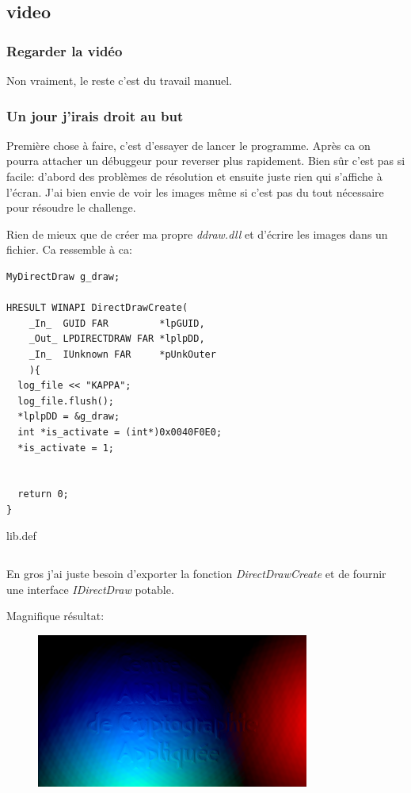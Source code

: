 \documentclass[14pt]{article}
\let\oldinputminted\inputminted
\renewcommand{\inputminted}[2]{\begin{tcolorbox}\oldinputminted[breaklines]{#1}{#2}\end{tcolorbox}}
\begin{document}
\subsection{video}
\subsubsection{Regarder la vidéo}
Non vraiment, le reste c'est du travail manuel.

\subsubsection{Un jour j'irais droit au but}

Première chose à faire, c'est d'essayer de lancer le programme. Après ca on pourra attacher un débuggeur pour reverser plus rapidement. Bien sûr c'est pas si facile: d'abord des problèmes de résolution et ensuite juste rien qui s'affiche à l'écran.
J'ai bien envie de voir les images même si c'est pas du tout nécessaire pour résoudre le challenge.

Rien de mieux que de créer ma propre {\em ddraw.dll} et d'écrire les images dans un fichier. Ca ressemble à ca:

\begin{verbatim}
MyDirectDraw g_draw;

HRESULT WINAPI DirectDrawCreate(
    _In_  GUID FAR         *lpGUID,
    _Out_ LPDIRECTDRAW FAR *lplpDD,
    _In_  IUnknown FAR     *pUnkOuter
    ){
  log_file << "KAPPA";
  log_file.flush();
  *lplpDD = &g_draw;
  int *is_activate = (int*)0x0040F0E0;
  *is_activate = 1;


  return 0;
}
\end{verbatim}


\begin{listing}[H]
  \caption{lib.def}
  \inputminted{text}{./challs/part3/video/Stage_anti_APT_chez_Airlhes/win/lib/lib.def}
\end{listing}

En gros j'ai juste besoin d'exporter la fonction {\em DirectDrawCreate} et de fournir une interface {\em IDirectDraw} potable.

Magnifique résultat:
\begin{figure}[H]
\includegraphics[width=0.8\textwidth]{./challs/part3/video/Stage_anti_APT_chez_Airlhes/win/res_0012.png}
\centering
  \label{video:img_screen}
\end{figure}
\end{document}
